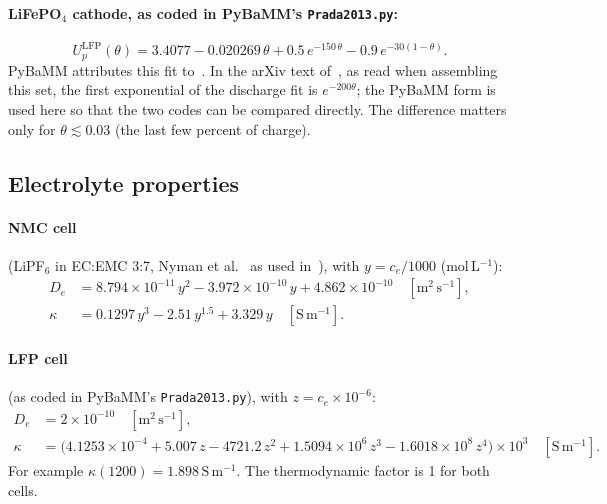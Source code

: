\documentclass[11pt]{article}
\newcommand{\ce}{c_{e}}
\newcommand{\code}[1]{\texttt{#1}}
\newcommand{\unit}[1]{\,\mathrm{#1}}
\begin{document}
\paragraph{LiFePO$_4$ cathode, as coded in PyBaMM's \code{Prada2013.py}:}
\begin{equation}
U_p^{\mathrm{LFP}}(\theta)=3.4077-0.020269\,\theta+0.5\,e^{-150\,\theta}-0.9\,e^{-30(1-\theta)}.
\end{equation}
PyBaMM attributes this fit to~\cite{afshar2017}. In the arXiv text of~\cite{afshar2017}, as read when assembling this set, the first exponential of the discharge fit is $e^{-200\theta}$; the PyBaMM form is used here so that the two codes can be compared directly. The difference matters only for $\theta\lesssim0.03$ (the last few percent of charge).

\subsection{Electrolyte properties}
\paragraph{NMC cell} (LiPF$_6$ in EC:EMC 3:7, Nyman et al.~\cite{nyman2008} as used in~\cite{chen2020}), with $y=\ce/1000$ (mol\,L$^{-1}$):
\begin{align}
D_e&=8.794\times10^{-11}\,y^{2}-3.972\times10^{-10}\,y+4.862\times10^{-10}\quad[\mathrm{m^2\,s^{-1}}], \label{eq:nymanD}\\
\kappa&=0.1297\,y^{3}-2.51\,y^{1.5}+3.329\,y\quad[\mathrm{S\,m^{-1}}]. \label{eq:nymanK}
\end{align}
\paragraph{LFP cell} (as coded in PyBaMM's \code{Prada2013.py}), with $z=\ce\times10^{-6}$:
\begin{align}
D_e&=2\times10^{-10}\quad[\mathrm{m^2\,s^{-1}}], \label{eq:pradaD}\\
\kappa&=\bigl(4.1253\times10^{-4}+5.007\,z-4721.2\,z^{2}+1.5094\times10^{6}\,z^{3}-1.6018\times10^{8}\,z^{4}\bigr)\times10^{3}\quad[\mathrm{S\,m^{-1}}]. \label{eq:pradaK}
\end{align}
For example $\kappa(1200)=1.898\unit{S\,m^{-1}}$. The thermodynamic factor is 1 for both cells.
\end{document}

